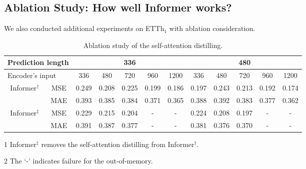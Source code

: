 \documentclass[letterpaper]{article} %
\newcommand{\mn}{Informer}
\begin{document}
\subsection{Ablation Study: How well {\mn} works?}
We also conducted additional experiments on ETTh$_1$ with ablation consideration.

\begin{table}[t]
\centering
\fontsize{9pt}{9pt}\selectfont
\begin{threeparttable}
\begin{tabular}{cc|ccccc|ccccc}
\toprule[1.0pt]
\multicolumn{2}{l|}{Prediction length}      & \multicolumn{5}{c|}{336}           & \multicolumn{5}{c}{480} \\
\midrule[0.5pt]
\multicolumn{2}{l|}{Encoder's input} & 336 & 480 & 720 & 960 & 1200 & 336 & 480 & 720 & 960 & 1200\\
\midrule[1.0pt]
\multirow{2}{*}{\mn$^{\dag}$} & MSE & 0.249 & 0.208 & 0.225 & 0.199 & 0.186 & 0.197 & 0.243 & 0.213 & 0.192 & 0.174\\
                              & MAE & 0.393 & 0.385 & 0.384 & 0.371 & 0.365 & 0.388 & 0.392 & 0.383 & 0.377 & 0.362 \\
\midrule[0.5pt]
\multirow{2}{*}{\mn$^{\ddag}$} & MSE & 0.229 & 0.215 & 0.204 & - & - & 0.224 & 0.208 & 0.197 & - & -  \\
                               & MAE & 0.391 & 0.387 & 0.377 & - & - & 0.381 & 0.376 & 0.370 & - & -\\
\bottomrule[1.0pt]
\end{tabular}
\begin{tablenotes}
\item[1] \mn$^{\ddag}$ removes the self-attention distilling from \mn$^{\dag}$.
\item[2] The `-' indicates failure for the out-of-memory.
\end{tablenotes}
\end{threeparttable}
\caption{Ablation study of the self-attention distilling.}
\label{tab:exp.ablation.distilling}
\end{table}
\end{document}
